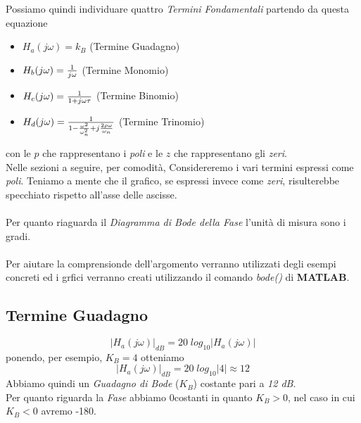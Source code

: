 \documentclass{article}
\begin{document}
		Possiamo quindi individuare quattro \textit{Termini Fondamentali} partendo da questa equazione
		\begin{itemize}
			\item $ H_a(j\omega) = k_B $ (Termine Guadagno)
			\item $ H_b(j\omega) = {{1}\over{j\omega}} $ (Termine Monomio)
			\item $ H_c(j\omega) = {{1}\over{1 + j\omega\tau}} $ (Termine Binomio)
			\item $ H_d(j\omega) = {{1}\over{1 - {{\omega^2}\over{\omega_n^2}} + j{{2\rho\omega}\over{\omega_n}} }} $ (Termine Trinomio)
		\end{itemize}
		con le $ p $ che rappresentano i \textit{poli} e le $ z $ che rappresentano gli \textit{zeri}. \\
		Nelle sezioni a seguire, per comodità, Considereremo i vari termini espressi come \textit{poli}. Teniamo a mente che il grafico, se espressi invece come \textit{zeri}, risulterebbe specchiato rispetto all'asse delle ascisse. \\
		\\
		Per quanto riaguarda il \textit{Diagramma di Bode della Fase} l'unità di misura sono i gradi. \\
		\\
		Per aiutare la comprensionde dell'argomento verranno utilizzati degli esempi concreti ed i grfici verranno creati utilizzando il comando \textit{bode()} di \textbf{MATLAB}.

		\subsection{Termine Guadagno}
			\[
				\vert H_a(j\omega) \vert_{dB} = 20\; log_{10}\vert H_a(j\omega) \vert
			\]
			ponendo, per esempio, $ K_B = 4 $ otteniamo
			\[
				\vert H_a(j\omega) \vert_{dB} = 20\; log_{10}\vert 4 \vert \approx 12
			\]
			Abbiamo quindi un \textit{Guadagno di Bode} ($ K_B $) costante pari a \textit{12 dB}. \\
			Per quanto riguarda la \textit{Fase} abbiamo 0\textdegree costanti in quanto $ K_B>0 $, nel caso in cui $ K_B<0 $ avremo -180\textdegree.
\end{document}
